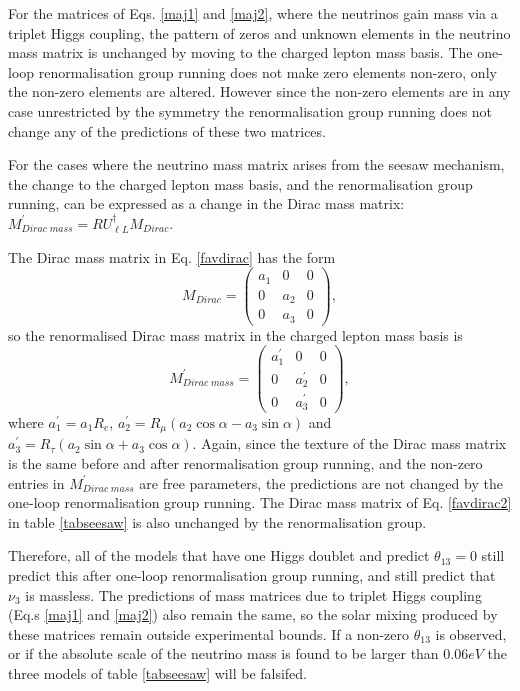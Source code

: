 \documentclass[nofootinbib,showpacs]{revtex4}
\begin{document}
For the matrices of Eqs. \ref{maj1} and \ref{maj2}, where the neutrinos gain mass via a triplet Higgs coupling, the pattern of zeros and unknown elements in the neutrino mass matrix is unchanged by moving to the charged lepton mass basis. The one-loop renormalisation group running does not make zero elements non-zero,  only the non-zero elements are altered. However since the non-zero elements are in any case unrestricted by the symmetry the renormalisation group running does not change any of the predictions of these two matrices. 



For the cases where the neutrino mass matrix arises from the seesaw mechanism, the change to the charged lepton mass basis, and the renormalisation group running, can be expressed as a change in the Dirac mass matrix: $M_{Dirac\;mass}^{'}= R U^\dagger_{\ell L}M_{Dirac}$.

The Dirac mass matrix in Eq. \ref{favdirac} has the form
\begin{equation}
M_{Dirac}=\left(\begin{array}{ccc}a_1&0&0\\0&a_2&0\\0&a_3&0\end{array}\right),
\end{equation}
so the renormalised Dirac mass matrix in the charged lepton mass basis is
\begin{equation}
M^{'}_{Dirac\;mass}=
\left(\begin{array}{ccc}a_1^{'}&0&0\\0&a_2^{'}&0\\0&a_3^{'}&0\end{array}\right),
\end{equation}
where $a_1^{'}=a_1 R_e$, $a_2^{'}=R_\mu (a_2 \cos \alpha - a_3 \sin \alpha )$ and $a_3^{'}=R_\tau (a_2 \sin \alpha + a_3 \cos \alpha  )$.
Again, since the texture of the Dirac mass matrix is the same before and after renormalisation group running, and the non-zero entries in $ M^{'}_{Dirac\;mass}$ are free parameters, the predictions are not changed by the one-loop renormalisation group running. 
The Dirac mass matrix of Eq. \ref{favdirac2} in table \ref{tabseesaw} is also unchanged by the renormalisation group. 

Therefore, all of the models that have one Higgs doublet and predict $\theta_{13}=0$ still predict this after one-loop renormalisation group running, and still predict that $\nu_3$ is massless. The predictions of mass matrices due to triplet Higgs coupling (Eq.s \ref{maj1} and \ref{maj2}) also remain the same, so the solar mixing produced by these matrices remain outside experimental bounds.    
If a non-zero $\theta_{13}$ is observed, or if the absolute scale of the neutrino mass is found to be larger than $0.06 eV$ the three models of table \ref{tabseesaw} will be falsifed.
\end{document}
